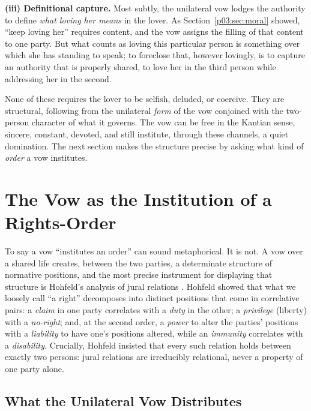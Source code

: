 \textbf{(iii) Definitional capture.} Most subtly, the unilateral vow lodges the authority to define \emph{what loving her means} in the lover. As Section~\ref{p03:sec:moral} showed, ``keep loving her'' requires content, and the vow assigns the filling of that content to one party. But what counts as loving this particular person is something over which she has standing to speak; to foreclose that, however lovingly, is to capture an authority that is properly shared, to love her in the third person while addressing her in the second.

None of these requires the lover to be selfish, deluded, or coercive. They are structural, following from the unilateral \emph{form} of the vow conjoined with the two-person character of what it governs. The vow can be free in the Kantian sense, sincere, constant, devoted, and still institute, through these channels, a quiet domination. The next section makes the structure precise by asking what kind of \emph{order} a vow institutes.

\section{The Vow as the Institution of a Rights-Order}\label{p03:sec:rights}

To say a vow ``institutes an order'' can sound metaphorical. It is not. A vow over a shared life creates, between the two parties, a determinate structure of normative positions, and the most precise instrument for displaying that structure is Hohfeld's analysis of jural relations \parencite{hohfeld1919fundamental}. Hohfeld showed that what we loosely call ``a right'' decomposes into distinct positions that come in correlative pairs: a \emph{claim} in one party correlates with a \emph{duty} in the other; a \emph{privilege} (liberty) with a \emph{no-right}; and, at the second order, a \emph{power} to alter the parties' positions with a \emph{liability} to have one's positions altered, while an \emph{immunity} correlates with a \emph{disability}. Crucially, Hohfeld insisted that every such relation holds between exactly two persons: jural relations are irreducibly relational, never a property of one party alone.

\subsection{What the Unilateral Vow Distributes}

